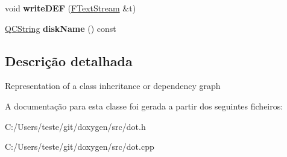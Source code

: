 \begin{DoxyCompactItemize}
\item 
\hypertarget{class_dot_class_graph_a7d3f6914c7a8c359003d9ad36c908905}{void {\bfseries write\-D\-E\-F} (\hyperlink{class_f_text_stream}{F\-Text\-Stream} \&t)}\label{class_dot_class_graph_a7d3f6914c7a8c359003d9ad36c908905}

\item 
\hypertarget{class_dot_class_graph_a0852c594a36fbcc44f5c947d6bf60646}{\hyperlink{class_q_c_string}{Q\-C\-String} {\bfseries disk\-Name} () const }\label{class_dot_class_graph_a0852c594a36fbcc44f5c947d6bf60646}

\end{DoxyCompactItemize}


\subsection{Descrição detalhada}
Representation of a class inheritance or dependency graph 

A documentação para esta classe foi gerada a partir dos seguintes ficheiros\-:\begin{DoxyCompactItemize}
\item 
C\-:/\-Users/teste/git/doxygen/src/dot.\-h\item 
C\-:/\-Users/teste/git/doxygen/src/dot.\-cpp\end{DoxyCompactItemize}

